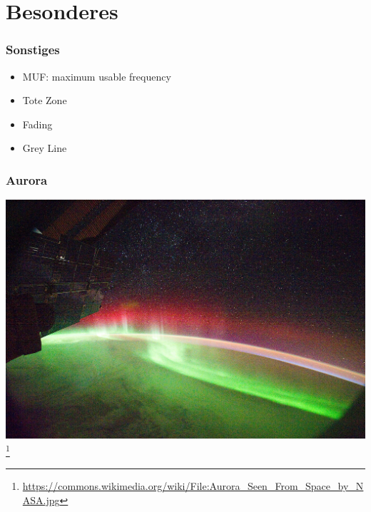 \section*{Besonderes}

\begin{frame}
    \frametitle{Sonstiges}
    \begin{itemize}
    			\item MUF: maximum usable frequency
				\item Tote Zone
       		 	\item Fading
       		 	\item Grey Line
    \end{itemize}
\end{frame}

\begin{frame}
    \frametitle{Aurora}
	\begin{center}
        \includegraphics[width=1\textwidth]{e09/Aurora_Seen_From_Space_by_NASA.jpg}
        \footnote{\tiny \url{https://commons.wikimedia.org/wiki/File:Aurora_Seen_From_Space_by_NASA.jpg}}
    \end{center}
\end{frame}

